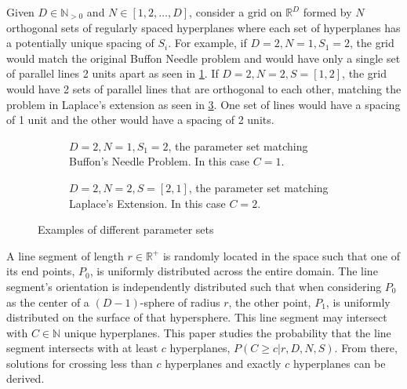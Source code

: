 \documentclass{article}
\begin{document}
Given $D\in\mathbb{N}_{>0}$ and $N\in[1,2,\dots,D]$, consider a grid on $\mathbb{R}^D$ formed by $N$ orthogonal sets of regularly spaced hyperplanes where each set of hyperplanes
has a potentially unique spacing of $S_i$. For example, if $D=2, N=1, S_1=2$, the grid would match the original Buffon Needle problem and would have only a single set of parallel lines 2 units apart as seen in \ref{fig:buffon example}.
If $D=2, N=2, S=[1, 2]$, the grid would have 2 sets of parallel lines that are orthogonal to each other, matching the problem in Laplace's extension as seen in \ref{fig:laplace example}. One set of lines would have a spacing of 1 unit and 
the other would have a spacing of 2 units.
\begin{figure}[h]
	\centering
	\begin{subfigure}{0.45\textwidth}
		\centering
		\caption{$D=2, N=1, S_1=2$, the parameter set matching Buffon's Needle Problem. In this case $C=1$.}
		\label{fig:buffon example}
	\end{subfigure}
	\hspace{1cm}
	\begin{subfigure}{0.45\textwidth}
		\centering
		\caption{$D=2, N=2, S=[2,1]$, the parameter set matching Laplace's Extension. In this case $C=2$.}
		\label{fig:laplace example}
	\end{subfigure}
	\caption{Examples of different parameter sets}
\end{figure}

A line segment of length $r\in\mathbb{R}^+$ is randomly located in the space such that one of its end points, $P_0$, is uniformly distributed
across the entire domain. The line segment's orientation is independently distributed such that when considering $P_0$ as the center of a $(D-1)$-sphere of radius $r$, the other point, $P_1$,
is uniformly distributed on the surface of that hypersphere. This line segment may intersect with $C\in\mathbb{N}$ unique hyperplanes. This paper studies the probability that the line segment
intersects with at least $c$ hyperplanes, $P(C\ge c|r, D, N, S)$. From there, solutions for crossing less than $c$ hyperplanes and exactly $c$ hyperplanes can
be derived.
\end{document}
